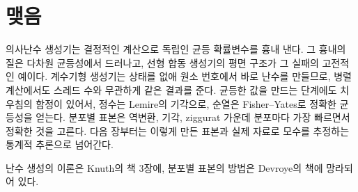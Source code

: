 \section{맺음}

의사난수 생성기는 결정적인 계산으로 독립인 균등 확률변수를 흉내 낸다. 그 흉내의 질은 다차원 균등성에서 드러나고, 선형 합동 생성기의 평면 구조가 그 실패의 고전적인 예이다. 계수기형 생성기는 상태를 없애 원소 번호에서 바로 난수를 만들므로, 병렬 계산에서도 스레드 수와 무관하게 같은 결과를 준다. 균등한 값을 만드는 단계에도 치우침의 함정이 있어서, 정수는 Lemire의 기각으로, 순열은 Fisher--Yates로 정확한 균등성을 얻는다. 분포별 표본은 역변환, 기각, ziggurat 가운데 분포마다 가장 빠르면서 정확한 것을 고른다. 다음 장부터는 이렇게 만든 표본과 실제 자료로 모수를 추정하는 통계적 추론으로 넘어간다.

난수 생성의 이론은 Knuth의 책\cite{knuth1997taocp2} 3장에, 분포별 표본의 방법은 Devroye의 책\cite{devroye1986}에 망라되어 있다.

\chapterreferences
